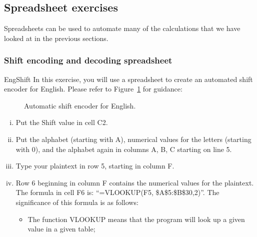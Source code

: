 \subsection{Spreadsheet exercises}
Spreadsheets can be used to automate many of the calculations that we have looked at in the previous sections.

\subsubsection*{Shift encoding and decoding spreadsheet \quad {}}

\begin{exercise}{EngShift}
In this exercise, you will use a spreadsheet to create an automated shift encoder for English. Please refer to Figure~\ref{fig:AutoShiftEnc} for guidance:
\begin{figure}[h]
\caption{Automatic shift encoder for English.}
\label{fig:AutoShiftEnc}
\end{figure}
\begin{enumerate}[(i)]
\item
Put the Shift value in cell C2.
\item
Put the alphabet (starting with A), numerical values for the letters (starting with 0), and the alphabet again in columns A, B, C starting on line 5.
\item
Type your plaintext in row 5, starting in column F.
\item
Row 6 beginning in column F contains the numerical values for the plaintext. The formula in cell F6 is: ``=VLOOKUP(F5, \$A\$5:\$B\$30,2)''. The significance of this formula is as follows:
\begin{itemize}
\item
The function VLOOKUP means that the program will look up a given value in a given table;

\end{itemize}
\end{enumerate}
\end{exercise}
